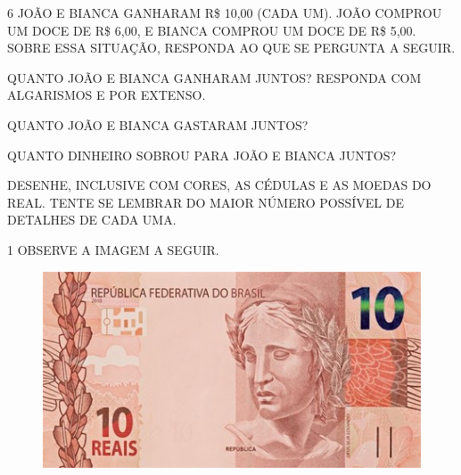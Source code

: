 
\pagebreak

\num{6} JOÃO E BIANCA GANHARAM R\$ 10,00 (CADA UM). JOÃO COMPROU UM DOCE DE R\$ 6,00,
E BIANCA COMPROU UM DOCE DE R\$ 5,00. SOBRE ESSA SITUAÇÃO, RESPONDA AO QUE SE PERGUNTA A SEGUIR.

\begin{escolha}
\item QUANTO JOÃO E BIANCA GANHARAM JUNTOS? RESPONDA COM ALGARISMOS E POR EXTENSO.


\item QUANTO JOÃO E BIANCA GASTARAM JUNTOS?


\item QUANTO DINHEIRO SOBROU PARA JOÃO E BIANCA JUNTOS?


\item DESENHE, INCLUSIVE COM CORES, AS CÉDULAS E AS MOEDAS DO REAL. TENTE SE LEMBRAR DO MAIOR NÚMERO POSSÍVEL DE DETALHES DE CADA UMA.
\end{escolha}

\begin{mdframed}[linewidth=2pt,linecolor=salmao,roundcorner=10pt]
\vspace{7cm}
\end{mdframed}

\pagebreak
{}

\num{1} OBSERVE A IMAGEM A SEGUIR.


\begin{figure}[htpb!]
\centering
\includegraphics[width=\textwidth]{../ilustracoes/MAT1/SAEB_1ANO_MAT_FIGURA82.jpg}
\end{figure}

